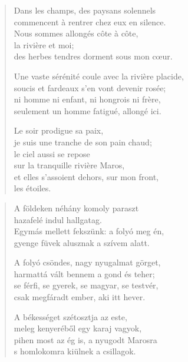 \documentclass[11pt]{extbook}
\newcommand*{\centeredornament}{\centerline{\pgfornament[width=6cm]{88}}}
\begin{document}
\begin{verse}
  Dans les champs, des paysans solennels \\
  commencent à rentrer chez eux en silence. \\
  Nous sommes allongés côte à côte, \\
  la rivière et moi; \\
  des herbes tendres dorment sous mon cœur.

  Une vaste sérénité coule avec la rivière placide,\hspace*{-4mm} \\
  soucis et fardeaux s'en vont devenir rosée; \\
  ni homme ni enfant, ni hongrois ni frère, \\
  seulement un homme fatigué, allongé ici.

  Le soir prodigue sa paix, \\
  je suis une tranche de son pain chaud; \\
  le ciel aussi se repose \\
  sur la tranquille rivière Maros, \\
  et elles s'assoient dehors, sur mon front, \\
  les étoiles.
\end{verse}

\newpage

\vspace*{-15mm}
\centeredornament



\begin{verse}
  A földeken néhány komoly paraszt \\
  hazafelé indul hallgatag. \\
  Egymás mellett fekszünk: a folyó meg én, \\
  gyenge füvek alusznak a szívem alatt.

  A folyó csöndes, nagy nyugalmat görget, \\
  harmattá vált bennem a gond és teher; \\
  se férfi, se gyerek, se magyar, se testvér, \\
  csak megfáradt ember, aki itt hever.

  A békességet szétosztja az este, \\
  meleg kenyeréből egy karaj vagyok, \\
  pihen most az ég is, a nyugodt Marosra \\
  s homlokomra kiülnek a csillagok.
\end{verse}
\end{document}
